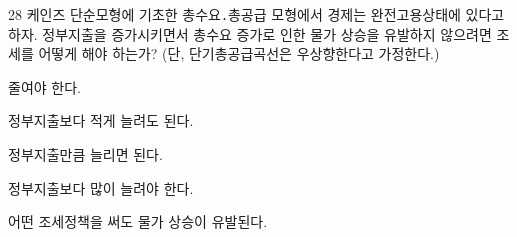 \begin{question}{28}
케인즈 단순모형에 기초한 총수요․총공급 모형에서 경제는 완전고용상태에 있다고 하자. 정부지출을 증가시키면서 총수요 증가로 인한 물가 상승을 유발하지 않으려면 조세를 어떻게 해야 하는가? (단, 단기총공급곡선은 우상향한다고 가정한다.)
\begin{choices}
  \item 줄여야 한다.
  \item 정부지출보다 적게 늘려도 된다.
  \item 정부지출만큼 늘리면 된다.
  \item 정부지출보다 많이 늘려야 한다.
  \item 어떤 조세정책을 써도 물가 상승이 유발된다.
\end{choices}
\end{question}
